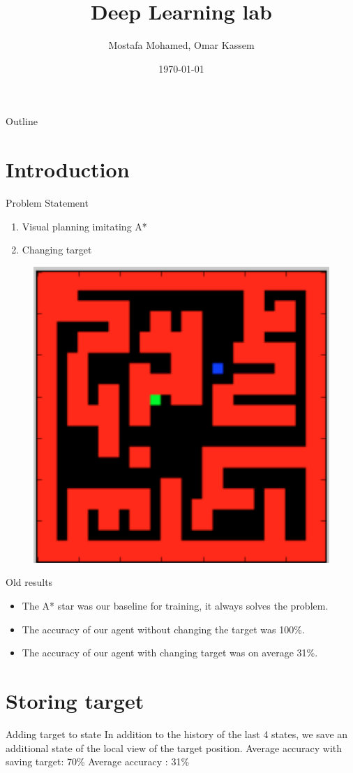 \documentclass{beamer}
\title[]{Deep Learning lab}
\subtitle{}
\author[Uni-Freiburg]{Mostafa Mohamed, Omar Kassem}
\date{\today}
\institute{Alberts-Ludwig Universt\"at Freiburg}
\begin{document}
\begin{frame}
\titlepage
\end{frame}

\begin{frame}{Outline}
  \setcounter{tocdepth}{1}
  \tableofcontents
\end{frame}

\section{Introduction}
\begin{frame}{Problem Statement}
\begin{enumerate}
\item Visual planning imitating A*
\item Changing target
\end{enumerate}
\begin{figure}
        \includegraphics[width=0.30\linewidth]{problem.png}
    \label{fig1}
\end{figure}
\end{frame}

\begin{frame}{Old results}
\begin{itemize}
    \item The A* star was our baseline for training, it always solves the problem.
    \item The accuracy of our agent without changing the target was 100\%.
    \item The accuracy of our agent with changing target was on average 31\%.
\end{itemize}
\end{frame}

\section{Storing target}
\begin{frame}{Adding target to state}
In addition to the history of the last 4 states, we save an additional state of the local view of the target position.
Average accuracy with saving target: 70\%
Average accuracy : 31\%
\end{frame}
\end{document}

